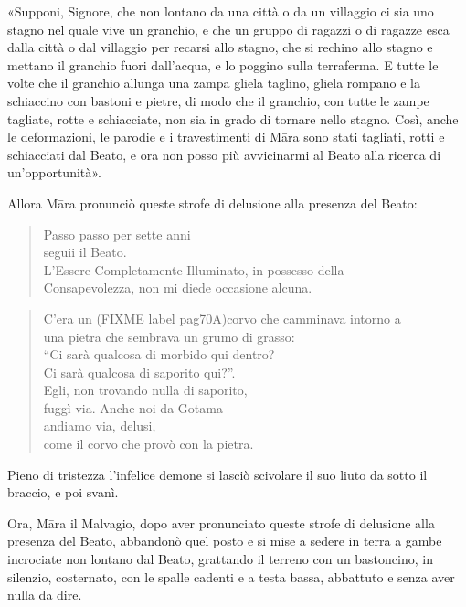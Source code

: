«Supponi, Signore, che non lontano da una città o da un villaggio ci sia
uno stagno nel quale vive un granchio, e che un gruppo di ragazzi o di
ragazze esca dalla città o dal villaggio per recarsi allo stagno, che si
rechino allo stagno e mettano il granchio fuori dall’acqua, e lo poggino
sulla terraferma. E tutte le volte che il granchio allunga una zampa
gliela taglino, gliela rompano e la schiaccino con bastoni e pietre, di
modo che il granchio, con tutte le zampe tagliate, rotte e schiacciate,
non sia in grado di tornare nello stagno. Così, anche le deformazioni,
le parodie e i travestimenti di Māra sono stati tagliati, rotti e
schiacciati dal Beato, e ora non posso più avvicinarmi al Beato alla
ricerca di un’opportunità».


Allora Māra pronunciò queste strofe di delusione alla presenza del
Beato:




\begin{quote}
Passo passo per sette anni \\
seguii il Beato. \\
L’Essere Completamente Illuminato, in possesso della \\
Consapevolezza, non mi diede occasione alcuna.
\end{quote}



\begin{quote}
C’era un (FIXME label pag70A)corvo che camminava intorno a \\
una pietra che sembrava un grumo di grasso: \\
“Ci sarà qualcosa di morbido qui dentro? \\
Ci sarà qualcosa di saporito qui?”. \\
Egli, non trovando nulla di saporito, \\
fuggì via. Anche noi da Gotama \\
andiamo via, delusi, \\
come il corvo che provò con la pietra.
\end{quote}

Pieno di tristezza l’infelice demone si lasciò scivolare il suo liuto da
sotto il braccio, e poi svanì.




Ora, Māra il Malvagio, dopo aver pronunciato queste strofe di delusione
alla presenza del Beato, abbandonò quel posto e si mise a sedere in
terra a gambe incrociate non lontano dal Beato, grattando il terreno con
un bastoncino, in silenzio, costernato, con le spalle cadenti e a testa
bassa, abbattuto e senza aver nulla da dire.


